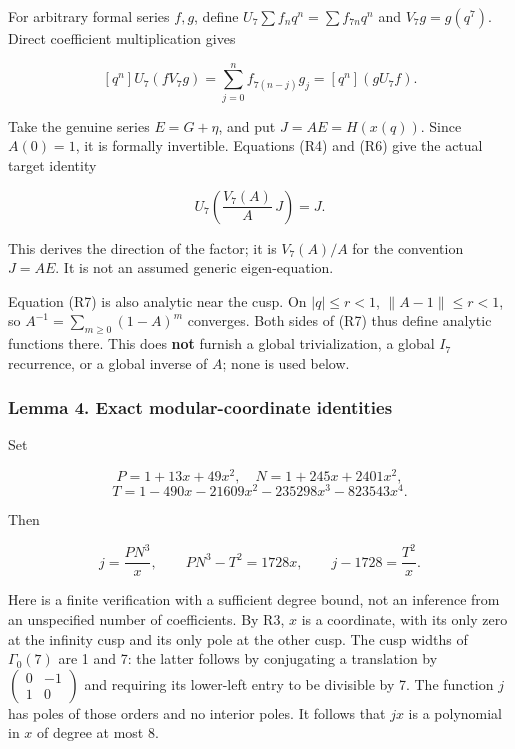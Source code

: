 \documentclass[11pt,a4paper]{article}
\begin{document}
For arbitrary formal series \(f,g\), define \(U_7\sum f_nq^n=\sum f_{7n}q^n\) and \(V_7g=g(q^7)\). Direct coefficient multiplication gives

\[
[q^n]U_7(fV_7g)=\sum_{j=0}^n f_{7(n-j)}g_j
=[q^n](gU_7f).
\tag{R6}
\]

Take the genuine series \(E=G+\eta\), and put \(J=AE=H(x(q))\). Since \(A(0)=1\), it is formally invertible. Equations (R4) and (R6) give the actual target identity

\[
\boxed{\quad U_7\left(\frac{V_7(A)}{A}\,J\right)=J.\quad}
\tag{R7}
\]

This derives the direction of the factor; it is \(V_7(A)/A\) for the convention \(J=AE\). It is not an assumed generic eigen-equation.

Equation (R7) is also analytic near the cusp. On \(|q|\le r<1\), \(\|A-1\|\le r<1\), so \(A^{-1}=\sum_{m\ge0}(1-A)^m\) converges. Both sides of (R7) thus define analytic functions there. This does \textbf{not} furnish a global trivialization, a global \(I_7\) recurrence, or a global inverse of \(A\); none is used below.

\hypertarget{lemma-4.-exact-modular-coordinate-identities}{%
\subsubsection{Lemma 4. Exact modular-coordinate identities}\label{lemma-4.-exact-modular-coordinate-identities}}

Set

\[
P=1+13x+49x^2,\quad N=1+245x+2401x^2,
\] \[
T=1-490x-21609x^2-235298x^3-823543x^4.
\]

Then

\[
j=\frac{PN^3}{x},\qquad PN^3-T^2=1728x,
\qquad j-1728=\frac{T^2}{x}.
\tag{R8}
\]

Here is a finite verification with a sufficient degree bound, not an inference from an unspecified number of coefficients. By R3, \(x\) is a coordinate, with its only zero at the infinity cusp and its only pole at the other cusp. The cusp widths of \(\Gamma_0(7)\) are 1 and 7: the latter follows by conjugating a translation by \(\begin{pmatrix}0&-1\\1&0\end{pmatrix}\) and requiring its lower-left entry to be divisible by 7. The function \(j\) has poles of those orders and no interior poles. It follows that \(jx\) is a polynomial in \(x\) of degree at most 8.
\end{document}
